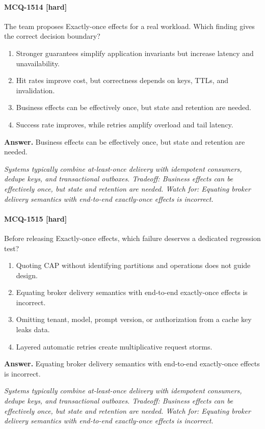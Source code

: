 \paragraph{MCQ-1514 [hard]} The team proposes Exactly-once effects for a real workload. Which finding gives the correct decision boundary?
\begin{enumerate}[label=\Alph*.]
\item Stronger guarantees simplify application invariants but increase latency and unavailability.
\item Hit rates improve cost, but correctness depends on keys, TTLs, and invalidation.
\item Business effects can be effectively once, but state and retention are needed.
\item Success rate improves, while retries amplify overload and tail latency.
\end{enumerate}
\noindent\textbf{Answer.} Business effects can be effectively once, but state and retention are needed.
\par\textit{Systems typically combine at-least-once delivery with idempotent consumers, dedupe keys, and transactional outboxes. Tradeoff: Business effects can be effectively once, but state and retention are needed. Watch for: Equating broker delivery semantics with end-to-end exactly-once effects is incorrect.}
\paragraph{MCQ-1515 [hard]} Before releasing Exactly-once effects, which failure deserves a dedicated regression test?
\begin{enumerate}[label=\Alph*.]
\item Quoting CAP without identifying partitions and operations does not guide design.
\item Equating broker delivery semantics with end-to-end exactly-once effects is incorrect.
\item Omitting tenant, model, prompt version, or authorization from a cache key leaks data.
\item Layered automatic retries create multiplicative request storms.
\end{enumerate}
\noindent\textbf{Answer.} Equating broker delivery semantics with end-to-end exactly-once effects is incorrect.
\par\textit{Systems typically combine at-least-once delivery with idempotent consumers, dedupe keys, and transactional outboxes. Tradeoff: Business effects can be effectively once, but state and retention are needed. Watch for: Equating broker delivery semantics with end-to-end exactly-once effects is incorrect.}

